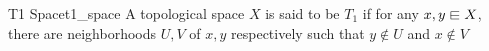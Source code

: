 \begin{definition}{T1 Space}{t1_space}
A topological space \( X \) is said to be \( T _{ 1 }  \) if for any \( x, y
\din X \), there are neighborhoods \( U, V \) of \( x, y \) respectively such
that \( y \not\in U \) and \( x \not\in V \) 
\end{definition}
